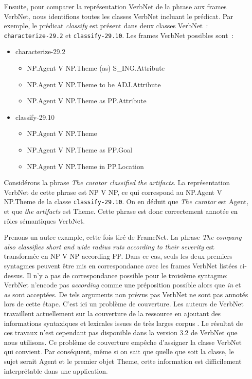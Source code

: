 Ensuite, pour comparer la représentation VerbNet de la phrase aux frames
VerbNet, nous identifions toutes les classes VerbNet incluant le prédicat. Par
exemple, le prédicat \textit{classify} est présent dans deux classes VerbNet~:
\texttt{characterize-29.2} et \texttt{classify-29.10}. Les frames VerbNet
possibles sont~:

\begin{itemize}
    \item characterize-29.2
    \begin{itemize}
        \item NP.Agent V NP.Theme (as) S\_ING.Attribute
        \item NP.Agent V NP.Theme to be ADJ.Attribute
        \item NP.Agent V NP.Theme as PP.Attribute
    \end{itemize}
    \item classify-29.10
    \begin{itemize}
        \item NP.Agent V NP.Theme
        \item NP.Agent V NP.Theme as PP.Goal
        \item NP.Agent V NP.Theme in PP.Location
    \end{itemize}
\end{itemize}

Considérons la phrase \textit{The curator classified the artifacts}. La
représentation VerbNet de cette phrase est NP V NP, ce qui correspond au
NP.Agent V NP.Theme de la classe \texttt{classify-29.10}. On en déduit que
\textit{The curator} est Agent, et que \textit{the artifacts} est Theme. Cette
phrase est donc correctement annotée en rôles sémantiques VerbNet.

Prenons un autre example, cette fois tiré de FrameNet. La phrase \textit{The
company also classifies short and wide radius ruts according to their severity}
est transformée en NP V NP according PP. Dans ce cas, seuls les deux premiers
syntagmes peuvent être mis en correspondance avec les frames VerbNet listées
ci-dessus. Il n'y a pas de correspondance possible pour le troisième syntagme:
VerbNet n'encode pas \textit{according} comme une préposition possible alors que
\textit{in} et \textit{as} sont acceptées. De tels arguments non prévus pas VerbNet
ne sont pas annotés lors de cette étape. C'est ici un problème de couverture.
Les auteurs de VerbNet travaillent actuellement sur la couverture de la
ressource en ajoutant des informations syntaxiques et lexicales issues de très
larges corpus \citep{bonial2013expanding}. Le résultat de ces travaux n'est
cependant pas disponible dans la version 3.2 de VerbNet que nous utilisons. Ce
problème de couverture empêche d'assigner la classe VerbNet qui convient. Par
conséquent, même si on sait que quelle que soit la classe, le sujet serait
Agent et le premier objet Theme, cette information est difficilement
interprétable dans une application.

